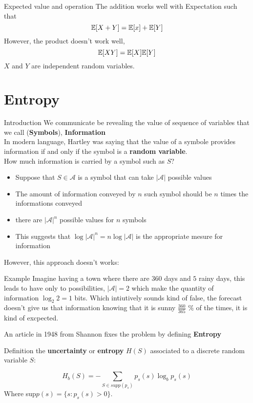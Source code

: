 
\begin{parag}{Expected value and operation}
    The addition works well with Expectation such that
    \[\mathbb{E}[X + Y] = \mathbb{E}[x] + \mathbb{E}[Y]\]
    However, the product doesn't work well, \\
    \[\mathbb{E}[XY] = \mathbb{E}[X]\mathbb{E}[Y]\]
     $X$ and $Y$ are independent random variables.
    
\end{parag}
\section{Entropy}
\begin{parag}{Introduction}
    We communicate be revealing the value of sequence of variables that we call (\textbf{Symbols}), \textbf{Information}
    \\
    In modern language, Hartley was saying that the value of a symbole provides information if and only if the symbol is a \textbf{random variable}.
    \\
    How much information is carried by a symbol such as $S$?
    \begin{itemize}
        \item Suppose that  $S \in \mathcal{A}$ is a symbol that can take $|\mathcal{A}|$ possible values
        \item The amount of information conveyed by $n$ such symbol should be $n$ times the informations conveyed
        \item there are $|\mathcal{A}|^n$ possible values for $n$ symbols
        \item This suggests that $\log|\mathcal{A}|^n = n\log |\mathcal{A|}$ is the appropriate mesure for information
    \end{itemize}
    However, this approach doesn't works:
    \begin{subparag}{Example}
        Imagine having a town where there are $360$ days and $5$ rainy days, this leads to have only to possibilities, $|\mathcal{A}| = 2$ which make the quantity of information $\log_2 2 = 1$ bits. Which intiutively sounds kind of false, the forecast doesn't give us that information knowing that it is sunny $\frac{360}{365}$ \% of the times, it is kind of excpected. 
    \end{subparag}
    An article in 1948 from Shannon fixes the problem by defining \textbf{Entropy}
\end{parag}
\begin{parag}{Definition}
    the \textbf{uncertainty} or \textbf{entropy} $H(S)$
    associated to a discrete random variable $S$:
    \begin{definition}
        \[H_b(S) = - \sum_{S \in supp(p_s)}p_s(s)\log_bp_s(s)\]
        Where sup$p(s) = \{s : p_s(s) > 0\}$.
    \end{definition}
\end{parag}

